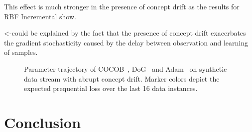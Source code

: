 \documentclass[letterpaper]{article} %
\begin{document}

\begin{equation}
\end{equation}


This effect is much stronger in the presence of concept drift as the results for RBF Incremental show.

<-could be explained by the fact that the presence of concept drift exacerbates the gradient stochasticity caused by the delay between observation and learning of samples.


\begin{figure}[ht]
	\centering
	\caption{Parameter trajectory of COCOB~\cite{orabonaTrainingDeepNetworks2017}, DoG~\cite{ivgiDoGSGDBest2023} and Adam~\cite{kingmaAdamMethodStochastic2017b} on synthetic data stream with abrupt concept drift. Marker colors depict the expected prequential loss over the last 16 data instances.}
\end{figure}

\section{Conclusion}



\end{document}

